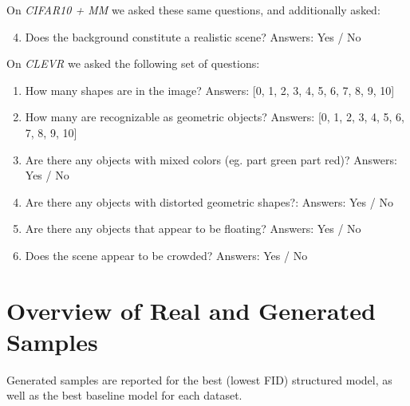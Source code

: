 \documentclass{article}
\begin{document}
On \emph{CIFAR10 + MM} we asked these same questions, and additionally asked:
\begin{enumerate}
\setcounter{enumi}{3}
\item Does the background constitute a realistic scene? Answers: Yes / No
\end{enumerate}

On \emph{CLEVR} we asked the following set of questions:
\begin{enumerate}
\item How many shapes are in the image? Answers: [0, 1, 2, 3, 4, 5, 6, 7, 8, 9, 10]
\item How many are recognizable as geometric objects? Answers: [0, 1, 2, 3, 4, 5, 6, 7, 8, 9, 10]
\item Are there any objects with mixed colors (eg. part green part red)? Answers: Yes / No
\item Are there any objects with distorted geometric shapes?: Answers: Yes / No
\item Are there any objects that appear to be floating? Answers: Yes / No
\item Does the scene appear to be crowded? Answers: Yes / No
\end{enumerate}

\newpage
\section{Overview of Real and Generated Samples}
\label{app:samples}
Generated samples are reported for the best (lowest FID) structured model, as well as the best baseline model for each dataset.
\end{document}
